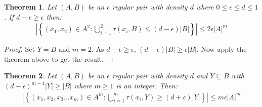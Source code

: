 \documentclass{article}
\newtheorem{theorem}{Theorem}[]
\begin{document}
\begin{theorem}
	Let $(A,B)$ be an $\epsilon$ regular pair with density $d$ where $0\leq  \epsilon\leq  d\leq  1$. If $d-\epsilon\geq  \epsilon$ then:
	\begin{align}
		\left|\left\{(x_1,x_2)\in A^2:\bigcup_{i=1}^2\tau(x_i,B)\leq (d-\epsilon)|B|\right\}\right|\leq  2\epsilon|A|^m
	\end{align}
\end{theorem}
\begin{proof}
	Set $Y=B$ and $m=2$. As $d-\epsilon\geq  \epsilon$, $(d-\epsilon)|B|\geq  \epsilon|B|$. Now apply the theorem above to get the result.
\end{proof}

































\begin{theorem}
	Let $(A,B)$ be an $\epsilon$ regular pair with density $d$ and $Y\subseteq B$ with $(d-\epsilon)^{m-1}|Y|\geq  |B|$ where $m\geq  1$ is an integer. Then:
	\begin{align}\left|\left\{(x_1,x_2,x_3\hdots x_m)\in A^m:\bigcup_{i=1}^m\tau(x_i,Y)\geq (d+\epsilon)|Y|\right\}\right|\leq  m\epsilon|A|^m\end{align}
\end{theorem}
\end{document}
